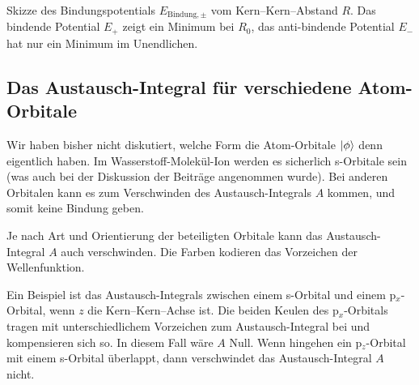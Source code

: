 \begin{marginfigure}

\caption{Skizze des Bindungspotentials $E_{\text{Bindung}, \pm}$ vom Kern--Kern--Abstand $R$. Das bindende Potential $E_+$ zeigt ein Minimum bei $R_0$, das anti-bindende Potential $E_-$ hat nur ein Minimum im Unendlichen.}
\end{marginfigure}








\subsection{Das Austausch-Integral für verschiedene Atom-Orbitale}

Wir haben bisher nicht diskutiert, welche Form die Atom-Orbitale $\ket{\phi}$ denn eigentlich haben.
Im Wasserstoff-Molekül-Ion   werden es sicherlich s-Orbitale sein (was auch bei der Diskussion der Beiträge angenommen wurde). Bei anderen Orbitalen kann es zum Verschwinden des Austausch-Integrals $A$ kommen, und somit keine Bindung geben.

\begin{marginfigure}

\caption{Je nach Art und Orientierung der beteiligten Orbitale kann das Austausch-Integral $A$ auch verschwinden. Die Farben kodieren das Vorzeichen der Wellenfunktion. }
\end{marginfigure}



Ein Beispiel ist das Austausch-Integrals zwischen  einem s-Orbital und einem p$_x$-Orbital, wenn $z$ die Kern--Kern--Achse ist.  Die beiden Keulen des  p$_x$-Orbitals tragen mit unterschiedlichem Vorzeichen zum Austausch-Integral bei und kompensieren sich so. In diesem Fall wäre $A$ Null. Wenn hingehen ein p$_z$-Orbital mit einem s-Orbital überlappt, dann verschwindet das  Austausch-Integral $A$ nicht.


